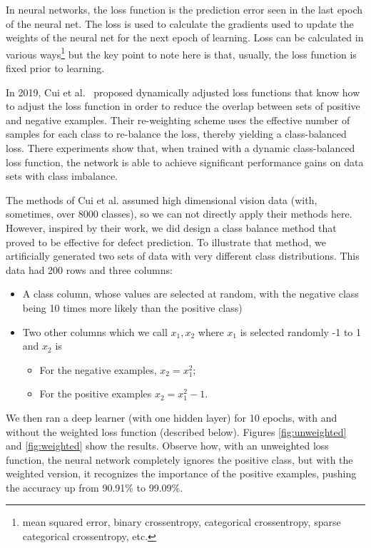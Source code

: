 \documentclass[10pt,compsoc,twocolumn]{IEEEtran}
\newcommand{\bi}{\begin{itemize}}
\newcommand{\ei}{\end{itemize}}
\begin{document}
In neural networks, the loss function is the prediction error seen in the last epoch of the
neural net. The loss is used to calculate the gradients used to  update the weights of the neural net for the next epoch of learning. 
Loss can be calculated in various ways\footnote{ 
mean squared error,  
binary crossentropy, 
categorical crossentropy,
sparse categorical crossentropy, etc. } but the key point to note here is that, usually, the loss function is fixed prior to learning.


In 2019, Cui et al.~\cite{Cui_2019_CVPR} proposed dynamically adjusted loss functions that know how to adjust the loss function in order to reduce the overlap between sets of positive and  negative examples.
Their re-weighting scheme   uses the effective number of samples for each class to re-balance the loss, thereby yielding a class-balanced loss. There experiments show that,
when trained with a dynamic class-balanced loss function, the network is able to achieve significant performance gains on data sets with class imbalance. 

The methods of  Cui et al. assumed high dimensional vision data (with, sometimes, over 8000 classes), so we can  not  directly apply their methods here. However, inspired by their work, we did design a class balance method that proved to be effective for defect prediction.
To illustrate that method, we artificially generated two sets of data with very different class distributions. This data had 200 rows and three columns:
\bi
\item A class column, whose values are selected at random, with the negative class being 10 times more likely than the positive class)

\item
Two other columns which we call $x_1, x_2$
where $x_1$ is selected  randomly -1 to 1
and $x_2$ is
\bi
\item For the negative examples,  $x_2=x_1^2$;
\item For the positive examples $x_2=x_1^2-1$.
\ei
\ei
We then ran a deep learner (with one hidden layer) for 10 epochs, with and without the weighted loss function (described below).
Figures \ref{fig:unweighted} and \ref{fig:weighted} show the results. 
Observe how,
with an unweighted loss function, the neural network completely ignores the positive class, but with the weighted version, it recognizes the importance of the positive examples, pushing the accuracy up from 90.91\% to 99.09\%. 
\end{document}
